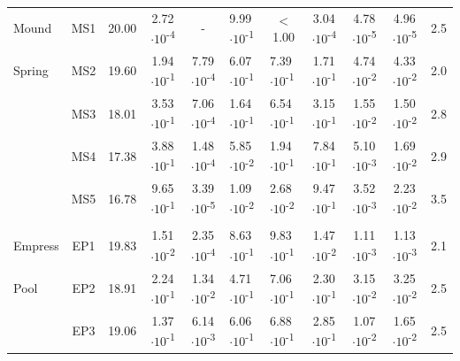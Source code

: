 {\begin{landscape}
\begin{table}
\begin{adjustbox}{width=600pt,keepaspectratio}
\begin{threeparttable}
\begin{tabular}{lccccllcccc}
Mound & MS1   & 20.00 & 2.72$\cdot 10$\textsuperscript{-4} & -     & 9.99$\cdot 10$\textsuperscript{-1} & \multicolumn{1}{c}{$<$ 1.00} & 3.04$\cdot 10$\textsuperscript{-4} & 4.78$\cdot 10$\textsuperscript{-5} & 4.96$\cdot 10$\textsuperscript{-5} & 2.5 \\
Spring & MS2   & 19.60 & 1.94$\cdot 10$\textsuperscript{-1} & 7.79$\cdot 10$\textsuperscript{-4} & 6.07$\cdot 10$\textsuperscript{-1} & 7.39$\cdot 10$\textsuperscript{-1} & 1.71$\cdot 10$\textsuperscript{-1} & 4.74$\cdot 10$\textsuperscript{-2} & 4.33$\cdot 10$\textsuperscript{-2} & 2.0 \\
      & MS3   & 18.01 & 3.53$\cdot 10$\textsuperscript{-1} & 7.06$\cdot 10$\textsuperscript{-4} & 1.64$\cdot 10$\textsuperscript{-1} & 6.54$\cdot 10$\textsuperscript{-1} & 3.15$\cdot 10$\textsuperscript{-1} & 1.55$\cdot 10$\textsuperscript{-2} & 1.50$\cdot 10$\textsuperscript{-2} & 2.8 \\
      & MS4   & 17.38 & 3.88$\cdot 10$\textsuperscript{-1} & 1.48$\cdot 10$\textsuperscript{-4} & 5.85$\cdot 10$\textsuperscript{-2} & 1.94$\cdot 10$\textsuperscript{-1} & 7.84$\cdot 10$\textsuperscript{-1} & 5.10$\cdot 10$\textsuperscript{-3} & 1.69$\cdot 10$\textsuperscript{-2} & 2.9 \\
      & MS5   & 16.78 & 9.65$\cdot 10$\textsuperscript{-1} & 3.39$\cdot 10$\textsuperscript{-5} & 1.09$\cdot 10$\textsuperscript{-2} & 2.68$\cdot 10$\textsuperscript{-2} & 9.47$\cdot 10$\textsuperscript{-1} & 3.52$\cdot 10$\textsuperscript{-3} & 2.23$\cdot 10$\textsuperscript{-2} & 3.5 \\
      &       &       &       &       &       &       &       &       &       &  \\
Empress & EP1   & 19.83 & 1.51$\cdot 10$\textsuperscript{-2} & 2.35$\cdot 10$\textsuperscript{-4} & 8.63$\cdot 10$\textsuperscript{-1} & 9.83$\cdot 10$\textsuperscript{-1} & 1.47$\cdot 10$\textsuperscript{-2} & 1.11$\cdot 10$\textsuperscript{-3} & 1.13$\cdot 10$\textsuperscript{-3} & 2.1 \\
Pool  & EP2   & 18.91 & 2.24$\cdot 10$\textsuperscript{-1} & 1.34$\cdot 10$\textsuperscript{-2} & 4.71$\cdot 10$\textsuperscript{-1} & 7.06$\cdot 10$\textsuperscript{-1} & 2.30$\cdot 10$\textsuperscript{-1} & 3.15$\cdot 10$\textsuperscript{-2} & 3.25$\cdot 10$\textsuperscript{-2} & 2.5 \\
      & EP3   & 19.06 & 1.37$\cdot 10$\textsuperscript{-1} & 6.14$\cdot 10$\textsuperscript{-3} & 6.06$\cdot 10$\textsuperscript{-1} & 6.88$\cdot 10$\textsuperscript{-1} & 2.85$\cdot 10$\textsuperscript{-1} & 1.07$\cdot 10$\textsuperscript{-2} & 1.65$\cdot 10$\textsuperscript{-2} & 2.5 \\

\end{tabular}
\end{threeparttable}
\end{adjustbox}
\end{table}
\end{landscape}}

